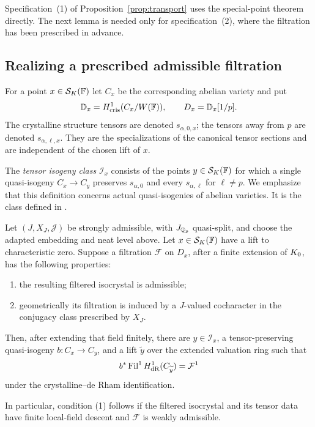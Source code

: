 Specification~\textup{(1)} of Proposition~\ref{prop:transport}
uses the special-point theorem
\cite[Theorem~2.2.7]{KisinZhou2025} directly.  The next lemma is
needed only for specification~\textup{(2)}, where the filtration
has been prescribed in advance.

\subsection{Realizing a prescribed admissible filtration}

For a point $x\in\mathcal S_K(\mathbb F)$ let $C_x$ be the corresponding
abelian variety and put
\[
 \mathbb D_x=H^1_{\mathrm{cris}}(C_x/W(\mathbb F)),\qquad
 D_x=\mathbb D_x[1/p].
\]
The crystalline structure tensors are denoted $s_{\alpha,0,x}$;
the tensors away from $p$ are denoted $s_{\alpha,\ell,x}$.
They are the specializations of the canonical tensor sections and
are independent of the chosen lift of $x$.

The \emph{tensor isogeny class} $\mathcal I_x$ consists of the points
$y\in\mathcal S_K(\mathbb F)$ for which a single quasi-isogeny
$C_x\to C_y$ preserves $s_{\alpha,0}$ and every
$s_{\alpha,\ell}$ for $\ell\ne p$.  We emphasize that this
definition concerns actual quasi-isogenies of abelian varieties.
It is the class defined in \cite[\S2.2.4]{KisinZhou2025}.

\begin{lemma}
\label{lem:admissible-realization}
Let $(J,X_J,\mathcal J)$ be strongly admissible, with $J_{\mathbb Q_p}$
quasi-split, and choose the adapted embedding and neat level above.
Let $x\in\mathcal S_K(\mathbb F)$ have a lift to characteristic zero.
Suppose a filtration $\mathcal F$ on $D_x$, after a finite extension
of $K_0$, has the following properties:
\begin{enumerate}
\item the resulting filtered isocrystal is admissible;
\item geometrically its filtration is induced by a $J$-valued
cocharacter in the conjugacy class prescribed by $X_J$.
\end{enumerate}
Then, after extending that field finitely, there are $y\in\mathcal I_x$,
a tensor-preserving quasi-isogeny $b:C_x\to C_y$, and a lift
$\widetilde y$ over the extended valuation ring such that
\[
 b^*\operatorname{Fil}^1 H^1_{\mathrm{dR}}(C_{\widetilde y})=\mathcal F^1
\]
under the crystalline--de Rham identification.

In particular, condition \textup{(1)} follows if the filtered
isocrystal and its tensor data have finite local-field descent and
$\mathcal F$ is weakly admissible.
\end{lemma}

